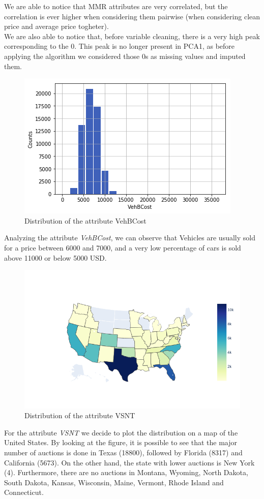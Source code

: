 \documentclass{article}
\begin{document}
	We are able to notice that MMR attributes are very correlated, but the correlation is ever higher when considering them pairwise (when considering clean price and average price togheter). \\
	We are also able to notice that, before variable cleaning, there is a very high peak corresponding to the 0. This peak is no longer present in PCA1, as before applying the algorithm we considered those 0s as missing values and imputed them. 
	
	\begin{figure}[H]
		\centering
		\includegraphics[width=.55\textwidth]{hist}\hfill
		\caption{Distribution of the attribute VehBCost}
	\end{figure}
	Analyzing the attribute \emph{VehBCost}, we can observe that Vehicles are usually sold for a price between 6000 and 7000, and a very low percentage of cars is sold above 11000 or below 5000 USD. 
	
	
	\begin{figure}[H]
		\centering
		\includegraphics[width=.7\textwidth, height=.6\textheight, keepaspectratio]{newplot.png}
		\caption{{ Distribution of the attribute VSNT}}
	\end{figure}
	
	
	For the attribute \emph{VSNT} we decide to plot the distribution on a map of the United States. By looking at the figure, it is possible to see that the major number of auctions is done in Texas (18800), followed by Florida (8317) and California (5673). On the other hand, the state with lower auctions is New York (4). Furthermore, there are no auctions in Montana, Wyoming, North Dakota, South Dakota, Kansas, Wisconsin, Maine, Vermont, Rhode Island and Connecticut. \\
	
\end{document}
